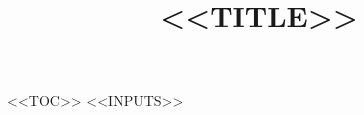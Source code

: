 \documentclass[11pt]{article}
\title{<<TITLE>>}
\date{}
\author{}
\begin{document}
\maketitle
<<TOC>>
<<INPUTS>>
\end{document}
